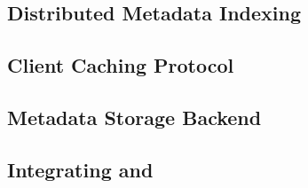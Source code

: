 \subsection{Distributed Metadata Indexing}
\label{design.giga}


\subsection{Client Caching Protocol}

\subsection{Metadata Storage Backend}
\label{design.tablefs}


\subsection{Integrating \giga{} and \tfs{}}
\label{design.integration}


